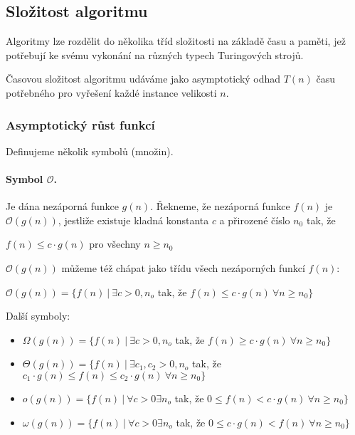 \subsection*{Složitost algoritmu}
Algoritmy lze rozdělit do několika tříd složitosti na základě času a paměti, jež potřebují ke svému vykonání na různých typech Turingových strojů. \cite{algoritmy:slozitosti}

Časovou složitost algoritmu udáváme jako asymptotický odhad $T(n)$ času potřebného pro vyřešení každé instance velikosti $n$.

\subsubsection*{Asymptotický růst funkcí} Definujeme několik symbolů (množin).

\paragraph{Symbol $\mathcal{O}$.} Je dána nezáporná funkce $g(n)$. Řekneme, že nezáporná funkce $f(n)$ je $\mathcal{O}(g(n))$, jestliže existuje kladná konstanta $c$ a přirozené číslo $n_0$ tak, že

\begin{center}
    $f(n) \leq c \cdot g(n)$ pro všechny $n \geq n_0$
\end{center}

$\mathcal{O}(g(n))$ můžeme též chápat jako třídu všech nezáporných funkcí $f(n)$:

\begin{center}
    $\mathcal{O}(g(n)) = \{ f(n)~|~\exists c > 0, n_o$ tak, že $f(n) \leq c \cdot g(n) ~ \forall n \geq n_0\}$
\end{center}
\noindent Další symboly:
\begin{itemize}[itemsep=0pt]
    \item $\Omega(g(n)) = \{ f(n)~|~\exists c > 0 ,n_o$ tak, že $f(n) \geq c \cdot g(n) ~ \forall n \geq n_0\}$
    \item $\Theta(g(n)) = \{ f(n)~|~\exists c_1,c_2 > 0 ,n_o$ tak, že $c_1 \cdot g(n) \leq f(n) \leq c_2 \cdot g(n) ~ \forall n \geq n_0\}$
    \item $o(g(n)) = \{ f(n)~|~\forall c > 0 \exists n_o$ tak, že $ 0 \leq f(n) < c \cdot g(n) ~ \forall n \geq n_0\}$
    \item $\omega(g(n)) = \{ f(n)~|~\forall c > 0 \exists n_o$ tak, že $ 0 \leq c \cdot g(n) < f(n) ~ \forall n \geq n_0\}$
\end{itemize}

